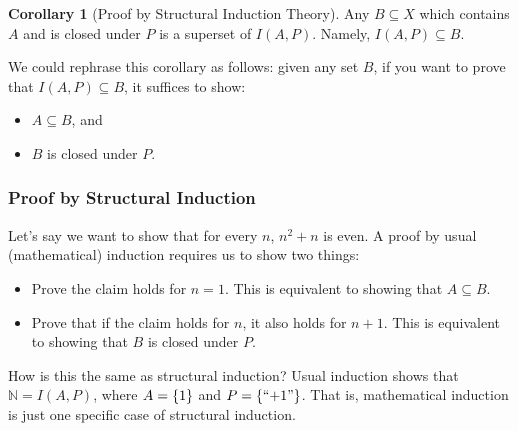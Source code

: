 \documentclass[]{article}
\DeclarePairedDelimiter{\set}{\lbrace}{\rbrace}
\theoremstyle{definition}
\newtheorem*{corollary}{Corollary}
\begin{document}
        \begin{corollary}[Proof by Structural Induction Theory]
          Any $B \subseteq X$ which contains $A$ and is closed under $P$ is a superset of $I(A, P)$. Namely, $I(A, P) \subseteq B$.
        \end{corollary}

        We could rephrase this corollary as follows: given any set $B$, if you want to prove that $I(A, P) \subseteq B$, it suffices to show:
        \begin{itemize}
          \item $A \subseteq B$, and
          \item $B$ is closed under $P$.
        \end{itemize}

      \subsubsection{Proof by Structural Induction}
        Let's say we want to show that for every $n$, $n^2 + n$ is even. A proof by usual (mathematical) induction requires us to show two things:
        \begin{itemize}
          \item Prove the claim holds for $n = 1$. This is equivalent to showing that $A \subseteq B$.
          \item Prove that if the claim holds for $n$, it also holds for $n + 1$. This is equivalent to showing that $B$ is closed under $P$.
        \end{itemize}

        How is this the same as structural induction? Usual induction shows that $\mathbb{N} = I(A, P)$, where $A = \set{1}$ and $P = \set{ \text{``+1''}}$. That is, mathematical induction is just one specific case of structural induction.
\end{document}
